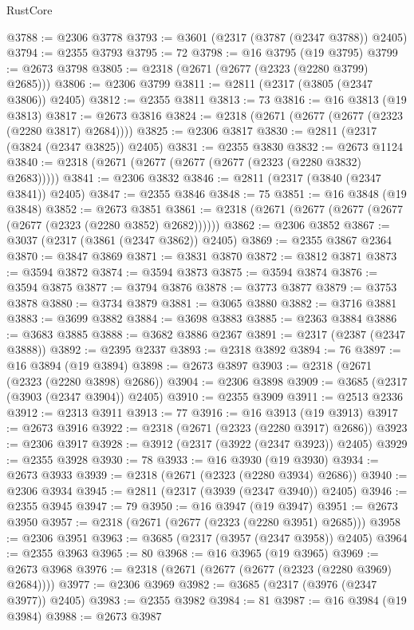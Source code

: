 \begin{lexlean}{RustCore}
\begin{coremodule}
@3788 := @2306 @3778
@3793 := @3601 (@2317 (@3787 (@2347 @3788)) @2405)
@3794 := @2355 @3793
@3795 := 72
@3798 := @16 @3795 (@19 @3795)
@3799 := @2673 @3798
@3805 := @2318 (@2671 (@2677 (@2323 (@2280 @3799) @2685)))
@3806 := @2306 @3799
@3811 := @2811 (@2317 (@3805 (@2347 @3806)) @2405)
@3812 := @2355 @3811
@3813 := 73
@3816 := @16 @3813 (@19 @3813)
@3817 := @2673 @3816
@3824 := @2318 (@2671 (@2677 (@2677 (@2323 (@2280 @3817) @2684))))
@3825 := @2306 @3817
@3830 := @2811 (@2317 (@3824 (@2347 @3825)) @2405)
@3831 := @2355 @3830
@3832 := @2673 @1124
@3840 := @2318 (@2671 (@2677 (@2677 (@2677 (@2323 (@2280 @3832) @2683)))))
@3841 := @2306 @3832
@3846 := @2811 (@2317 (@3840 (@2347 @3841)) @2405)
@3847 := @2355 @3846
@3848 := 75
@3851 := @16 @3848 (@19 @3848)
@3852 := @2673 @3851
@3861 := @2318 (@2671 (@2677 (@2677 (@2677 (@2677 (@2323 (@2280 @3852) @2682))))))
@3862 := @2306 @3852
@3867 := @3037 (@2317 (@3861 (@2347 @3862)) @2405)
@3869 := @2355 @3867 @2364
@3870 := @3847 @3869
@3871 := @3831 @3870
@3872 := @3812 @3871
@3873 := @3594 @3872
@3874 := @3594 @3873
@3875 := @3594 @3874
@3876 := @3594 @3875
@3877 := @3794 @3876
@3878 := @3773 @3877
@3879 := @3753 @3878
@3880 := @3734 @3879
@3881 := @3065 @3880
@3882 := @3716 @3881
@3883 := @3699 @3882
@3884 := @3698 @3883
@3885 := @2363 @3884
@3886 := @3683 @3885
@3888 := @3682 @3886 @2367
@3891 := @2317 (@2387 (@2347 @3888))
@3892 := @2395 @2337
@3893 := @2318 @3892
@3894 := 76
@3897 := @16 @3894 (@19 @3894)
@3898 := @2673 @3897
@3903 := @2318 (@2671 (@2323 (@2280 @3898) @2686))
@3904 := @2306 @3898
@3909 := @3685 (@2317 (@3903 (@2347 @3904)) @2405)
@3910 := @2355 @3909
@3911 := @2513 @2336
@3912 := @2313 @3911
@3913 := 77
@3916 := @16 @3913 (@19 @3913)
@3917 := @2673 @3916
@3922 := @2318 (@2671 (@2323 (@2280 @3917) @2686))
@3923 := @2306 @3917
@3928 := @3912 (@2317 (@3922 (@2347 @3923)) @2405)
@3929 := @2355 @3928
@3930 := 78
@3933 := @16 @3930 (@19 @3930)
@3934 := @2673 @3933
@3939 := @2318 (@2671 (@2323 (@2280 @3934) @2686))
@3940 := @2306 @3934
@3945 := @2811 (@2317 (@3939 (@2347 @3940)) @2405)
@3946 := @2355 @3945
@3947 := 79
@3950 := @16 @3947 (@19 @3947)
@3951 := @2673 @3950
@3957 := @2318 (@2671 (@2677 (@2323 (@2280 @3951) @2685)))
@3958 := @2306 @3951
@3963 := @3685 (@2317 (@3957 (@2347 @3958)) @2405)
@3964 := @2355 @3963
@3965 := 80
@3968 := @16 @3965 (@19 @3965)
@3969 := @2673 @3968
@3976 := @2318 (@2671 (@2677 (@2677 (@2323 (@2280 @3969) @2684))))
@3977 := @2306 @3969
@3982 := @3685 (@2317 (@3976 (@2347 @3977)) @2405)
@3983 := @2355 @3982
@3984 := 81
@3987 := @16 @3984 (@19 @3984)
@3988 := @2673 @3987

\end{coremodule}
\end{lexlean}
